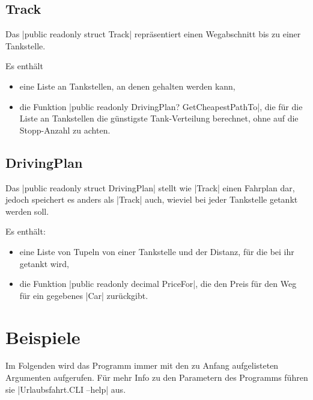 \documentclass[a4paper,10pt,ngerman]{scrartcl}
\begin{document}
\subsection{Track}
    Das |public readonly struct Track| repräsentiert einen Wegabschnitt bis zu einer Tankstelle.

    Es enthält
    \begin{itemize}
        \item eine Liste an Tankstellen, an denen gehalten werden kann,
        \item die Funktion |public readonly DrivingPlan? GetCheapestPathTo|, die für die Liste an Tankstellen die günstigste Tank-Verteilung berechnet, ohne auf die Stopp-Anzahl zu achten.
    \end{itemize}
    
\subsection{DrivingPlan}
    Das |public readonly struct DrivingPlan| stellt wie |Track| einen Fahrplan dar, jedoch speichert es anders als |Track| auch, wieviel bei jeder Tankstelle getankt werden soll.

    Es enthält:
    \begin{itemize}
        \item eine Liste von Tupeln von einer Tankstelle und der Distanz, für die bei ihr getankt wird,
        \item die Funktion |public readonly decimal PriceFor|, die den Preis für den Weg für ein gegebenes |Car| zurückgibt.
    \end{itemize}

\section{Beispiele}

Im Folgenden wird das Programm immer mit den zu Anfang aufgelisteten Argumenten aufgerufen.
Für mehr Info zu den Parametern des Programms führen sie |Urlaubsfahrt.CLI --help| aus.
\end{document}
